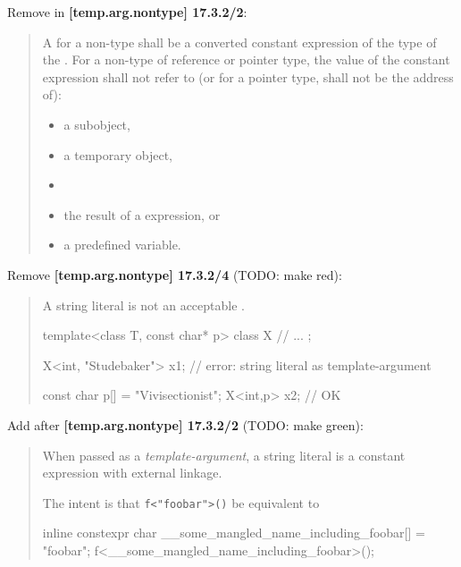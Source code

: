 \documentclass{wg21}
\newcommand{\cc}[1]{\texttt{#1}}
\begin{document}
Remove in \textbf{[temp.arg.nontype] 17.3.2/2}:

\begin{quote}
  A  for a non-type 
  shall be a converted constant expression of the type of the
  . For a non-type 
  of reference or pointer type, the value of the constant expression shall not
  refer to (or for a pointer type, shall not be the address of):

  \begin{itemize}
  \item a subobject,
  \item a temporary object,
  \item {}
  \item the result of a  expression, or
  \item a predefined  variable.
  \end{itemize}
\end{quote}

Remove \textbf{[temp.arg.nontype] 17.3.2/4} (TODO: make red):

\begin{quote}
  \begin{note}
  A string literal
  is not an acceptable
  .
  \begin{example}

  \begin{codeblock}
  template<class T, const char* p> class X {
    // ...
  };

  X<int, "Studebaker"> x1;        // error: string literal as template-argument

  const char p[] = "Vivisectionist";
  X<int,p> x2;                    // OK
  \end{codeblock}
  \end{example}
  \end{note}
\end{quote}

Add after \textbf{[temp.arg.nontype] 17.3.2/2} (TODO: make green):

\begin{quote}
  When passed as a \textit{template-argument}, a string literal is a constant
  expression with external linkage.
  \begin{note}
    The intent is that \cc{f<"foobar">()} be equivalent to
    \begin{cpp}
      inline constexpr char __some_mangled_name_including_foobar[] = "foobar";
      f<__some_mangled_name_including_foobar>();
    \end{cpp}
  \end{note}
\end{quote}
\end{document}
